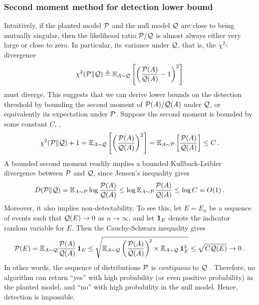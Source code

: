 \subsubsection{Second moment method for detection lower bound}
Intuitively, if the planted model $\P$ and the null model $\Q$ are close to being mutually singular, then the likelihood ratio $\P/\Q$ is almost always either very large or close to zero.  In particular, its variance under $\Q$, that is, the $\chi^2$-divergence
\[
\chi^2(\P\|\Q) \triangleq  \Exp_{A \sim \Q} 
 \left[ \left( \frac{\P(A) } {\Q(A)} -1 \right)^{2} \right] 
\]
 must diverge. This suggests that we can derive lower bounds on the detection threshold 
by bounding the second moment of $\P(A)/\Q(A)$ under $\Q$, or equivalently its expectation under $\P$.  
Suppose the second moment is bounded by some constant $C$, \ie,
\begin{align}
\label{eq:smm-bound}
\chi^2(\P\|\Q)+1=
\Exp_{A \sim \Q} 
 \left[ \left( \frac{\P(A) } {\Q(A)} \right)^{2} \right] 
= \Exp_{A \sim \P}  \left[ \frac{\P(A)}{\Q(A)} \right] 
\le C \, .
\end{align}
A bounded second moment readily implies a bounded Kullback-Leibler divergence between $\P$ and $\Q$, since Jensen's inequality gives
 \begin{align}
 D (\P \| \Q)  = \Exp_{A \sim \P} \log \frac{\P(A)}{\Q(A)} \le \log \Exp_{A \sim \P} \frac{\P(A)}{\Q(A)} 
 \le \log C = O(1) \, . \label{eq:secondmoment_KL}
 \end{align}
 Moreover, it also implies non-detectability. To see this, 
 let $E=E_n$ be a sequence of events such that $\Q(E) \to 0$ as $n\to \infty$, 
 and let $\indicator{E}$ denote the indicator random variable for $E$.  Then the Cauchy-Schwarz inequality gives
 \begin{align} 
	\P(E) 
	= \Exp_{A \sim \Q} \frac{\P(A)}{\Q(A)} \,\indicator{E}  
	 \le \sqrt{
	\Exp_{A \sim \Q}  \left( \frac{\P(A)}{\Q(A)} \right)^{\!2}  
	\times \Exp_{A \sim \Q} \,\indicator{E}^2 }  
	 \le \sqrt{C \Q(E)} \to 0 \, . \label{eq: contiguity}
\end{align}
In other words, the sequence of distributions $\P$ is \emph{contiguous} to $\Q$ \cite{Lecam86}.
Therefore, 
no algorithm can return ``yes'' with high probability (or even positive probability) in the planted model, and ``no'' with high probability in the null model. Hence, detection is impossible. 
 




